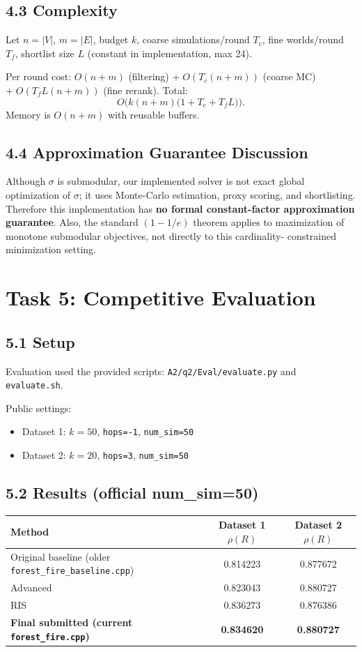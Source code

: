 \documentclass[9pt,a4paper]{article}
\begin{document}
\subsection*{4.3 Complexity}
Let $n=|V|$, $m=|E|$, budget $k$, coarse simulations/round $T_c$, fine worlds/round
$T_f$, shortlist size $L$ (constant in implementation, max 24).

Per round cost: $O(n+m)$ (filtering) $+\;O(T_c(n+m))$ (coarse MC)
$+\;O(T_fL(n+m))$ (fine rerank).
Total:
\[
O\Big(k(n+m)\big(1+T_c+T_fL\big)\Big).
\]
Memory is $O(n+m)$ with reusable buffers.

\subsection*{4.4 Approximation Guarantee Discussion}
Although $\sigma$ is submodular, our implemented solver is not exact global
optimization of $\sigma$; it uses Monte-Carlo estimation, proxy scoring, and
shortlisting. Therefore this implementation has \textbf{no formal constant-factor
approximation guarantee}. Also, the standard $(1-1/e)$ theorem applies to
maximization of monotone submodular objectives, not directly to this cardinality-
constrained minimization setting.

\section*{Task 5: Competitive Evaluation}
\subsection*{5.1 Setup}
Evaluation used the provided scripts:
\texttt{A2/q2/Eval/evaluate.py} and \texttt{evaluate.sh}.

Public settings:
\begin{itemize}
\item Dataset 1: $k=50$, \texttt{hops=-1}, \texttt{num\_sim=50}
\item Dataset 2: $k=20$, \texttt{hops=3}, \texttt{num\_sim=50}
\end{itemize}

\subsection*{5.2 Results (official num\_sim=50)}
\begin{center}
\begin{tabular}{|l|c|c|}
\hline
Method & Dataset 1 $\rho(R)$ & Dataset 2 $\rho(R)$ \\
\hline
Original baseline (older \texttt{forest\_fire\_baseline.cpp}) & 0.814223 & 0.877672 \\
Advanced & 0.823043 & 0.880727 \\
RIS & 0.836273 & 0.876386 \\
\textbf{Final submitted (current \texttt{forest\_fire.cpp})} & \textbf{0.834620} & \textbf{0.880727} \\
\hline
\end{tabular}
\end{center}
\end{document}
